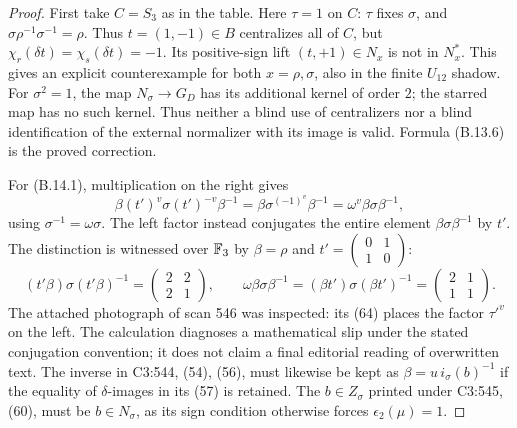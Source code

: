 \begin{proof}
First take $C=S_3$ as in the table. Here $\tau=1$ on $C$:
$\tau$ fixes $\sigma$, and
$\sigma\rho^{-1}\sigma^{-1}=\rho$.
Thus $t=(1,-1)\in B$ centralizes all of $C$, but
$\chi_r(\delta t)=\chi_s(\delta t)=-1$.
Its positive-sign lift $(t,+1)\in N_x$ is not in $N_x^*$.
This gives an explicit counterexample for both $x=\rho,\sigma$,
also in the finite $U_{12}$ shadow. For $\sigma^2=1$, the map
$N_\sigma\to G_D$ has its additional kernel of order $2$;
the starred map has no such kernel. Thus neither a blind use of
centralizers nor a blind identification of the external normalizer
with its image is valid. Formula (B.13.6) is the proved correction.

For (B.14.1), multiplication on the right gives
\[
 \beta(t')^v\sigma(t')^{-v}\beta^{-1}
    =\beta\sigma^{(-1)^v}\beta^{-1}
    =\omega^v\beta\sigma\beta^{-1},
\]
using $\sigma^{-1}=\omega\sigma$. The left factor instead
conjugates the entire element $\beta\sigma\beta^{-1}$ by $t'$.
The distinction is witnessed over $\mathbb F_3$ by $\beta=\rho$ and
$t'=\left(\begin{smallmatrix}0&1\\1&0\end{smallmatrix}\right)$:
\[
 (t'\beta)\sigma(t'\beta)^{-1}
       =\begin{pmatrix}2&2\\2&1\end{pmatrix},\qquad
 \omega\beta\sigma\beta^{-1}
       =(\beta t')\sigma(\beta t')^{-1}
       =\begin{pmatrix}2&1\\1&1\end{pmatrix}.
\]
The attached photograph of scan 546 was inspected: its (64)
places the factor $\tau'^v$ on the left. The calculation diagnoses
a mathematical slip under the stated conjugation convention;
it does not claim a final editorial reading of overwritten text.
The inverse in C3:544, (54), (56), must likewise be kept as
$\beta=u\,i_\sigma(b)^{-1}$ if the equality of $\delta$-images
in its (57) is retained. The $b\in Z_\sigma$ printed under
C3:545, (60), must be $b\in N_\sigma$, as its sign condition
otherwise forces $\epsilon_2(\mu)=1$.


\end{proof}
